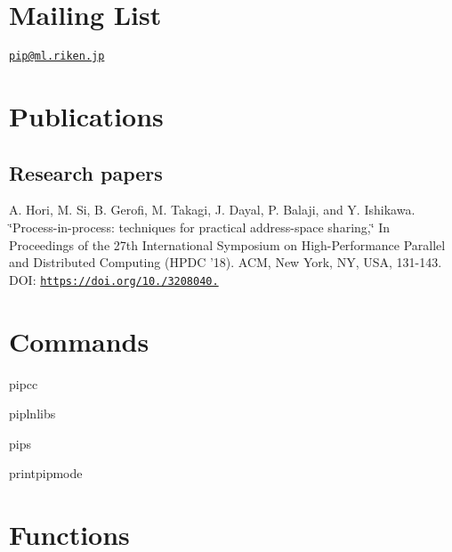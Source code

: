 \section*{Mailing List}

\href{mailto:pip@ml.riken.jp}{\tt pip@ml.\-riken.\-jp}

\section*{Publications}

\subsection*{Research papers}

A. Hori, M. Si, B. Gerofi, M. Takagi, J. Dayal, P. Balaji, and Y. Ishikawa. \char`\"{}\-Process-\/in-\/process\-: techniques for practical address-\/space sharing,\char`\"{} In Proceedings of the 27th International Symposium on High-\/\-Performance Parallel and Distributed Computing (H\-P\-D\-C '18). A\-C\-M, New York, N\-Y, U\-S\-A, 131-\/143. D\-O\-I\-: \href{https://doi.org/10.1145/3208040.3208045}{\tt https\-://doi.\-org/10./3208040.}

\section*{Commands}


\begin{DoxyItemize}
\item pipcc
\item piplnlibs
\item pips
\item printpipmode
\end{DoxyItemize}

\section*{Functions}


